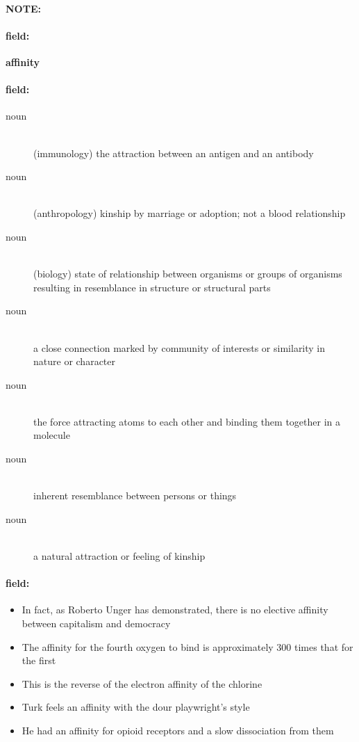 \documentclass[12pt]{article}
\newenvironment{note}{\paragraph{NOTE:}}{}
\newenvironment{field}{\paragraph{field:}}{}
\begin{document}
\begin{note}
\begin{field}
\textbf{\large affinity}
\end{field}


\begin{field}
\begin{description}
\item[noun] \hfill \\ 
(immunology) the attraction between an antigen and an antibody

\item[noun] \hfill \\ 
(anthropology) kinship by marriage or adoption; not a blood relationship

\item[noun] \hfill \\ 
(biology) state of relationship between organisms or groups of organisms resulting in resemblance in structure or structural parts

\item[noun] \hfill \\ 
a close connection marked by community of interests or similarity in nature or character

\item[noun] \hfill \\ 
the force attracting atoms to each other and binding them together in a molecule

\item[noun] \hfill \\ 
inherent resemblance between persons or things

\item[noun] \hfill \\ 
a natural attraction or feeling of kinship

\end{description}
\end{field}

\begin{field}
\begin{itemize}
\item In fact, as Roberto Unger has demonstrated, there is no elective affinity between capitalism and democracy
\item The affinity for the fourth oxygen to bind is approximately 300 times that for the first
\item This is the reverse of the electron affinity of the chlorine
\item Turk feels an affinity with the dour playwright's style
\item He had an affinity for opioid receptors and a slow dissociation from them
\end{itemize}
\end{field}
\end{note}
\end{document}
